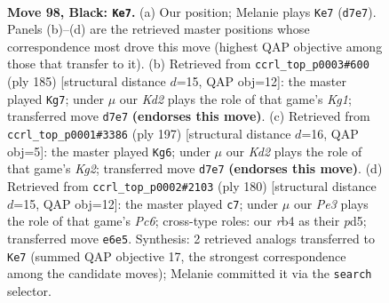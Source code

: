 \documentclass[11pt]{article}
\begin{document}
\clearpage

\begin{figure}[p]\centering
\begin{subfigure}{0.46\textwidth}\centering
\resizebox{\linewidth}{!}{%
\newchessgame
\chessboard[
  setfen={8/3k4/4pR2/8/1R2P3/5PK1/8/r7 b - - 0 98},
  showmover=false,
  pgfstyle=straightmove, color=movearrow, markmove={d7-e7}
]}
\caption{}
\end{subfigure}\hfill
\begin{subfigure}{0.46\textwidth}\centering
\resizebox{\linewidth}{!}{%
\newchessgame
\chessboard[
  setfen={6k1/2R2p2/8/6P1/5PK1/8/r7/8 b - - 4 93},
  showmover=false,
  pgfstyle=straightmove, color=movearrow, markmove={g8-g7}
]}
\caption{}
\end{subfigure}
\\[4pt]
\begin{subfigure}{0.46\textwidth}\centering
\resizebox{\linewidth}{!}{%
\newchessgame
\chessboard[
  setfen={8/6k1/7p/r7/6P1/5PK1/8/7R b - - 8 99},
  showmover=false,
  pgfstyle=straightmove, color=movearrow, markmove={g7-g6}
]}
\caption{}
\end{subfigure}\hfill
\begin{subfigure}{0.46\textwidth}\centering
\resizebox{\linewidth}{!}{%
\newchessgame
\chessboard[
  setfen={4R3/8/2PK1k2/3p1p2/2r3p1/8/8/8 w - - 1 91},
  showmover=false,
  pgfstyle=straightmove, color=movearrow, markmove={c6-c7}
]}
\caption{}
\end{subfigure}
\caption{\textbf{Move 98, Black: \texttt{Ke7}.} (a) Our position; Melanie plays \texttt{Ke7} (\texttt{d7e7}). Panels (b)--(d) are the retrieved master positions whose correspondence most drove this move (highest QAP objective among those that transfer to it). (b) Retrieved from \texttt{ccrl\_top\_p0003\#600} (ply 185) [structural distance $d$=15, QAP obj=12]: the master played \texttt{Kg7}; under $\mu$ our \emph{Kd2} plays the role of that game's \emph{Kg1}; transferred move \texttt{d7e7} \textbf{(endorses this move)}. (c) Retrieved from \texttt{ccrl\_top\_p0001\#3386} (ply 197) [structural distance $d$=16, QAP obj=5]: the master played \texttt{Kg6}; under $\mu$ our \emph{Kd2} plays the role of that game's \emph{Kg2}; transferred move \texttt{d7e7} \textbf{(endorses this move)}. (d) Retrieved from \texttt{ccrl\_top\_p0002\#2103} (ply 180) [structural distance $d$=15, QAP obj=12]: the master played \texttt{c7}; under $\mu$ our \emph{Pe3} plays the role of that game's \emph{Pc6}; cross-type roles: our \emph{r}b4 as their \emph{p}d5; transferred move \texttt{e6e5}. Synthesis: 2 retrieved analogs transferred to \texttt{Ke7} (summed QAP objective 17, the strongest correspondence among the candidate moves); Melanie committed it via the \texttt{search} selector.}
\label{fig:thought-m195}
\end{figure}
\end{document}
